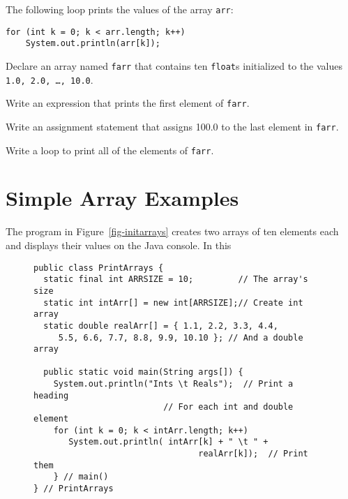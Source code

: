 \noindent The following loop prints the values of the array {\tt arr}:

\begin{jjjlisting}
\begin{lstlisting}
for (int k = 0; k < arr.length; k++)
    System.out.println(arr[k]);
\end{lstlisting}
\end{jjjlisting}

\begin{SSTUDY}

\item  Declare an array named {\tt farr} that contains ten {\tt float}s
initialized to the values {\tt 1.0, 2.0, \dots , 10.0}.

\item  Write an expression that prints the first element of {\tt farr}.


\item  Write an assignment statement that assigns 100.0 to
the last element in {\tt farr}.


\item  Write a loop to print all of the elements of {\tt farr}.

\end{SSTUDY}


\section{Simple Array Examples}

\noindent The program in Figure~\ref{fig-initarrays} creates two arrays of ten
elements each and displays their values on the Java console.   In this
\begin{figure}[h!]
\jjjprogstart
\begin{jjjlisting}[27pc]
\begin{lstlisting}
public class PrintArrays { 
  static final int ARRSIZE = 10;         // The array's size
  static int intArr[] = new int[ARRSIZE];// Create int array
  static double realArr[] = { 1.1, 2.2, 3.3, 4.4,
     5.5, 6.6, 7.7, 8.8, 9.9, 10.10 }; // And a double array

  public static void main(String args[]) {
    System.out.println("Ints \t Reals");  // Print a heading
                          // For each int and double element
    for (int k = 0; k < intArr.length; k++) 
       System.out.println( intArr[k] + " \t " + 
                                 realArr[k]);  // Print them
    } // main()
} // PrintArrays
\end{lstlisting}
\end{jjjlisting}
\end{figure} 

